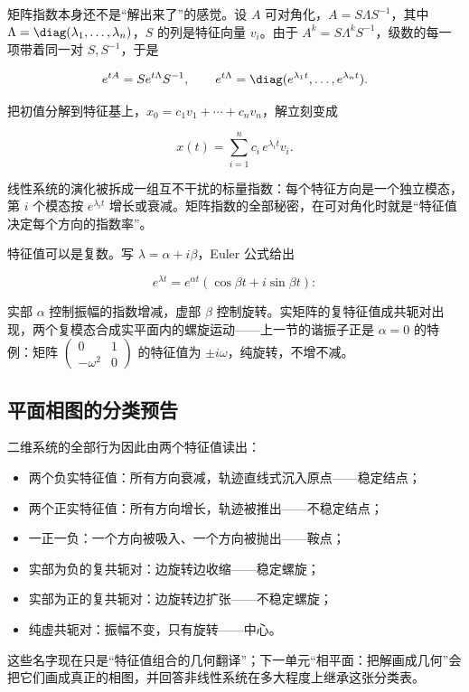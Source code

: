 矩阵指数本身还不是``解出来了''的感觉。设 \(A\) 可对角化，\(A=S\Lambda S^{-1}\)，其中 \(\Lambda=\diag(\lambda_1,\ldots,\lambda_n)\)，\(S\) 的列是特征向量 \(v_i\)。由于 \(A^k=S\Lambda^kS^{-1}\)，级数的每一项带着同一对 \(S,S^{-1}\)，于是

\[
e^{tA}=Se^{t\Lambda}S^{-1},
\qquad
e^{t\Lambda}=\diag(e^{\lambda_1t},\ldots,e^{\lambda_nt}).
\]

把初值分解到特征基上，\(x_0=c_1v_1+\cdots+c_nv_n\)，解立刻变成

\[
x(t)=\sum_{i=1}^{n}c_i\,e^{\lambda_it}v_i.
\]

线性系统的演化被拆成一组互不干扰的标量指数：每个特征方向是一个独立模态，第 \(i\) 个模态按 \(e^{\lambda_it}\) 增长或衰减。矩阵指数的全部秘密，在可对角化时就是``特征值决定每个方向的指数率''。

特征值可以是复数。写 \(\lambda=\alpha+i\beta\)，Euler 公式给出

\[
e^{\lambda t}=e^{\alpha t}(\cos\beta t+i\sin\beta t):
\]

实部 \(\alpha\) 控制振幅的指数增减，虚部 \(\beta\) 控制旋转。实矩阵的复特征值成共轭对出现，两个复模态合成实平面内的螺旋运动——上一节的谐振子正是 \(\alpha=0\) 的特例：矩阵 \(\begin{pmatrix}0&1\\-\omega^2&0\end{pmatrix}\) 的特征值为 \(\pm i\omega\)，纯旋转，不增不减。

\subsection{平面相图的分类预告}

二维系统的全部行为因此由两个特征值读出：

\begin{itemize}
\tightlist
\item
  两个负实特征值：所有方向衰减，轨迹直线式沉入原点——稳定结点；
\item
  两个正实特征值：所有方向增长，轨迹被推出——不稳定结点；
\item
  一正一负：一个方向被吸入、一个方向被抛出——鞍点；
\item
  实部为负的复共轭对：边旋转边收缩——稳定螺旋；
\item
  实部为正的复共轭对：边旋转边扩张——不稳定螺旋；
\item
  纯虚共轭对：振幅不变，只有旋转——中心。
\end{itemize}

这些名字现在只是``特征值组合的几何翻译''；下一单元``相平面：把解画成几何''会把它们画成真正的相图，并回答非线性系统在多大程度上继承这张分类表。

